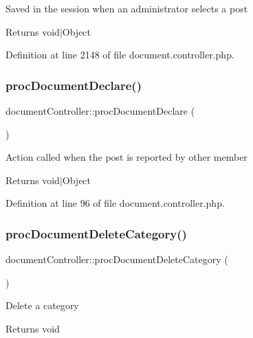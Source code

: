 Saved in the session when an administrator selects a post \begin{DoxyReturn}{Returns}
void$\vert$\+Object 
\end{DoxyReturn}


Definition at line 2148 of file document.\+controller.\+php.

\mbox{\label{classdocumentController_a9c23f01e72bf1028d72f43ebf08d0cee}} 
\subsubsection{\texorpdfstring{proc\+Document\+Declare()}{procDocumentDeclare()}}
{\footnotesize\ttfamily document\+Controller\+::proc\+Document\+Declare (\begin{DoxyParamCaption}{ }\end{DoxyParamCaption})}

Action called when the post is reported by other member \begin{DoxyReturn}{Returns}
void$\vert$\+Object 
\end{DoxyReturn}


Definition at line 96 of file document.\+controller.\+php.

\mbox{\label{classdocumentController_a60d6012f96c71ee539d4152bc2c6f994}} 
\subsubsection{\texorpdfstring{proc\+Document\+Delete\+Category()}{procDocumentDeleteCategory()}}
{\footnotesize\ttfamily document\+Controller\+::proc\+Document\+Delete\+Category (\begin{DoxyParamCaption}{ }\end{DoxyParamCaption})}

Delete a category \begin{DoxyReturn}{Returns}
void 
\end{DoxyReturn}



